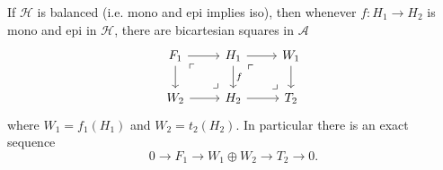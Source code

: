 \begin{lemma}
  If $\mathcal{H}$ is balanced (i.e. mono and epi implies iso), then whenever $f:H_1\to H_2$
  is mono and epi in $\mathcal{H}$, there are bicartesian squares in $\mathcal{A}$
  \begin{equation*}
    \begin{tikzcd}
      F_1\arrow{r}\arrow{d}\arrow[phantom,"\ulcorner",very near start]{dr}
        \arrow[phantom,"\lrcorner",very near end]{dr}
        & H_1\arrow{r}\arrow{d}{f}\arrow[phantom,"\ulcorner",very near start]{dr}
          \arrow[phantom,"\lrcorner",very near end]{dr}
          & W_1\arrow{d}\\
      W_2\arrow{r}
        & H_2\arrow{r}
          & T_2
    \end{tikzcd}
  \end{equation*}
  where $W_1=f_1(H_1)$ and $W_2=t_2(H_2)$. In particular there is an exact sequence
  \begin{equation*}
    0\to F_1\to W_1\oplus W_2 \to T_2\to 0.
  \end{equation*}
\end{lemma}

